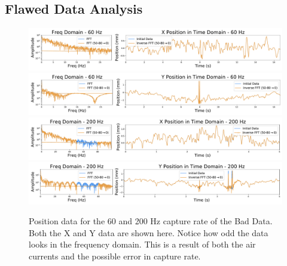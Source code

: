 \documentclass[12pt]{article}
\begin{document}
\subsection{Flawed Data Analysis}
\begin{figure}[!ht]
\centering
    \includegraphics[width=\textwidth]{data_33_x_pos.pdf}
    \includegraphics[width=\textwidth]{data_33_y_pos.pdf}
    \includegraphics[width=\textwidth]{data_36_x_pos.pdf}
    \includegraphics[width=\textwidth]{data_36_y_pos.pdf}
	\caption{Position data for the 60 and 200 Hz capture rate of the Bad Data. Both the X and Y data are shown here. Notice how odd the data looks in the frequency domain. This is a result of both the air currents and the possible error in capture rate.}
    \label{fig:flawed_pos}    
\end{figure}
\end{document}

